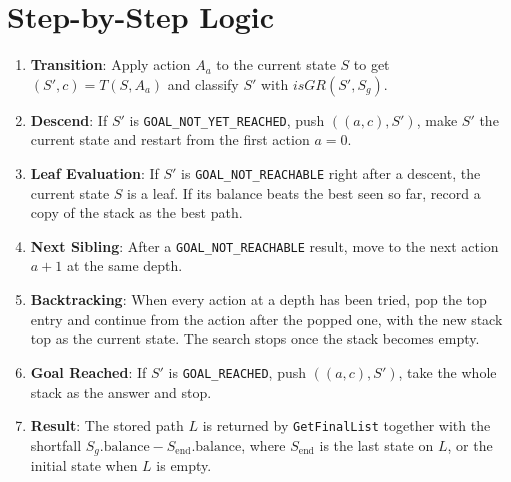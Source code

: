 \documentclass[11pt]{article}
\begin{document}
\section{Step-by-Step Logic}
\begin{enumerate}\itemsep 0pt \parskip 0pt
    \item \textbf{Transition}: Apply action $A_a$ to the current state $S$ to
          get $(S', c) = T(S, A_a)$ and classify $S'$ with
          $\mathit{isGR}(S', S_g)$.
    \item \textbf{Descend}: If $S'$ is \texttt{GOAL\_NOT\_YET\_REACHED}, push
          $((a, c), S')$, make $S'$ the current state and restart from the
          first action $a = 0$.
    \item \textbf{Leaf Evaluation}: If $S'$ is \texttt{GOAL\_NOT\_REACHABLE}
          right after a descent, the current state $S$ is a leaf. If its
          balance beats the best seen so far, record a copy of the stack as
          the best path.
    \item \textbf{Next Sibling}: After a \texttt{GOAL\_NOT\_REACHABLE} result,
          move to the next action $a + 1$ at the same depth.
    \item \textbf{Backtracking}: When every action at a depth has been tried,
          pop the top entry and continue from the action after the popped
          one, with the new stack top as the current state. The search stops
          once the stack becomes empty.
    \item \textbf{Goal Reached}: If $S'$ is \texttt{GOAL\_REACHED}, push
          $((a, c), S')$, take the whole stack as the answer and stop.
    \item \textbf{Result}: The stored path $L$ is returned by
          \texttt{GetFinalList} together with the shortfall
          $S_g.\text{balance} - S_{\text{end}}.\text{balance}$, where
          $S_{\text{end}}$ is the last state on $L$, or the initial state when
          $L$ is empty.
\end{enumerate}
\end{document}
